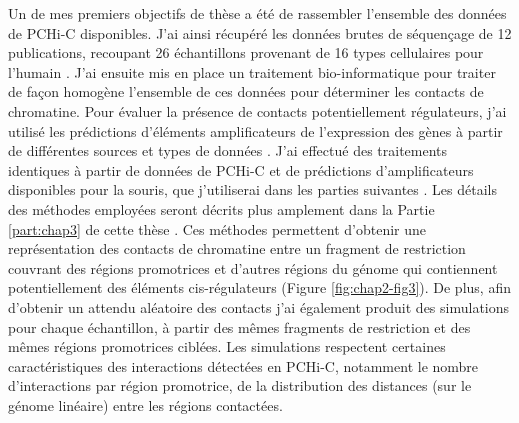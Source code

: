 Un de mes premiers objectifs de thèse a été de rassembler l’ensemble des données de \gls{PCHi-C} disponibles. J’ai ainsi récupéré les données brutes de séquençage de 12 publications, recoupant 26 échantillons provenant de 16 types cellulaires pour l’humain \citep{choy_promoter_2018, freire-pritchett_global_2017, javierre_lineage-specific_2016, mifsud_mapping_2015, pan_integration_2018, rubin_lineage-specific_2017}. J’ai ensuite mis en place un traitement bio-informatique pour traiter de façon homogène l’ensemble de ces données pour déterminer les contacts de chromatine. Pour évaluer la présence de contacts potentiellement régulateurs, j’ai utilisé les prédictions d'éléments \glspl{amplificateur} de l’expression des gènes à partir de différentes sources et types de données \citep{andersson_atlas_2014, roadmap_epigenomics_consortium_integrative_2015, hait_focs_2018}. J’ai effectué des traitements identiques à partir de données de \gls{PCHi-C} et de prédictions d’\glspl{amplificateur} disponibles pour la souris, que j’utiliserai dans les parties suivantes \citep{comoglio_thrombopoietin_2018, koohy_genome_2018, novo_long-range_2018, schoenfelder_pluripotent_2015, schoenfelder_divergent_2018, siersbaek_dynamic_2017}. Les détails des méthodes employées seront décrits plus amplement dans la Partie \ref{part:chap3} de cette thèse \citep{laverre_long-range_2022}. Ces méthodes permettent d’obtenir une représentation des contacts de chromatine entre un fragment de restriction couvrant des régions promotrices et d’autres régions du génome qui contiennent potentiellement des éléments \gls{cis}-régulateurs (Figure \ref{fig:chap2-fig3}). De plus, afin d’obtenir un attendu aléatoire des contacts j’ai également produit des simulations pour chaque échantillon, à partir des mêmes fragments de restriction et des mêmes régions promotrices ciblées. Les simulations respectent certaines caractéristiques des interactions détectées en PCHi-C, notamment le nombre d'interactions par région promotrice, de la distribution des distances (sur le génome linéaire) entre les régions contactées.\\

